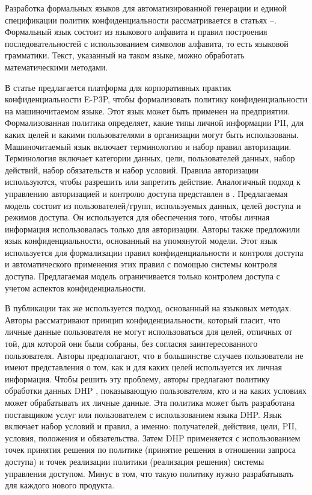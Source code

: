 \documentclass[../main]{subfiles}
\begin{document}
Разработка формальных языков для автоматизированной генерации и единой спецификации политик конфиденциальности рассматривается в статьях \cite{MDPI11}--\cite{MDPI15}. Формальный язык состоит из языкового алфавита и правил построения последовательностей с использованием символов алфавита, то есть языковой грамматики. Текст, указанный на таком языке, можно обработать математическими методами.

В статье \cite{MDPI11} предлагается платформа для корпоративных практик конфиденциальности E-P3P, чтобы формализовать политику конфиденциальности на машиночитаемом языке. Этот язык может быть применен на предприятии. Формализованная политика определяет, какие типы личной информации PII, для каких целей и какими пользователями в организации могут быть использованы. Машиночитаемый язык включает терминологию и набор правил авторизации. Терминология включает категории данных, цели, пользователей данных, набор действий, набор обязательств и набор условий. Правила авторизации используются, чтобы разрешить или запретить действие. Аналогичный подход к управлению авторизацией и контролю доступа представлен в \cite{MDPI12}. Предлагаемая модель состоит из пользователей/групп, используемых данных, целей доступа и режимов доступа. Он используется для обеспечения того, чтобы личная информация использовалась только для авторизации. Авторы \cite{MDPI12} также предложили язык конфиденциальности, основанный на упомянутой модели. Этот язык используется для формализации правил конфиденциальности и контроля доступа и автоматического применения этих правил с помощью системы контроля доступа. Предлагаемая модель ограничивается только контролем доступа с учетом аспектов конфиденциальности.

В публикации \cite{MDPI13} так же используется подход, основанный на языковых методах. Авторы \cite{MDPI13} рассматривают принцип конфиденциальности, который гласит, что личные данные пользователя не могут использоваться для целей, отличных от той, для которой они были собраны, без согласия заинтересованного пользователя. Авторы \cite{MDPI13} предполагают, что в большинстве случаев пользователи не имеют представления о том, как и для каких целей используется их личная информация. Чтобы решить эту проблему, авторы предлагают политику обработки данных DHP \cite{MDPI13}, показывающую пользователям, кто и на каких условиях может обрабатывать их личные данные. Эта политика может быть разработана поставщиком услуг или пользователем с использованием языка DHP. Язык включает набор условий и правил, а именно: получателей, действия, цели, PII, условия, положения и обязательства. Затем DHP применяется с использованием точек принятия решения по политике (принятие решения в отношении запроса доступа) и точек реализации политики (реализация решения) системы управления доступом. Минус в том, что такую ​​политику нужно разрабатывать для каждого нового продукта.
\end{document}
